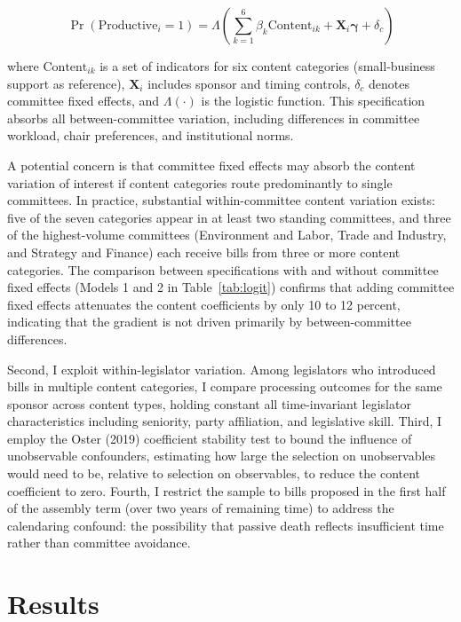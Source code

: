 \documentclass[11pt]{article}
\begin{document}
\begin{equation}
\Pr(\text{Productive}_i = 1) = \Lambda\left(\sum_{k=1}^{6} \beta_k \text{Content}_{ik} + \mathbf{X}_i \boldsymbol{\gamma} + \delta_c \right)
\label{eq:main}
\end{equation}

\noindent where $\text{Content}_{ik}$ is a set of indicators for six content categories (small-business support as reference), $\mathbf{X}_i$ includes sponsor and timing controls, $\delta_c$ denotes committee fixed effects, and $\Lambda(\cdot)$ is the logistic function. This specification absorbs all between-committee variation, including differences in committee workload, chair preferences, and institutional norms.

A potential concern is that committee fixed effects may absorb the content variation of interest if content categories route predominantly to single committees. In practice, substantial within-committee content variation exists: five of the seven categories appear in at least two standing committees, and three of the highest-volume committees (Environment and Labor, Trade and Industry, and Strategy and Finance) each receive bills from three or more content categories. The comparison between specifications with and without committee fixed effects (Models 1 and 2 in Table~\ref{tab:logit}) confirms that adding committee fixed effects attenuates the content coefficients by only 10 to 12 percent, indicating that the gradient is not driven primarily by between-committee differences.

Second, I exploit within-legislator variation. Among legislators who introduced bills in multiple content categories, I compare processing outcomes for the same sponsor across content types, holding constant all time-invariant legislator characteristics including seniority, party affiliation, and legislative skill. Third, I employ the Oster (2019) coefficient stability test to bound the influence of unobservable confounders, estimating how large the selection on unobservables would need to be, relative to selection on observables, to reduce the content coefficient to zero. Fourth, I restrict the sample to bills proposed in the first half of the assembly term (over two years of remaining time) to address the calendaring confound: the possibility that passive death reflects insufficient time rather than committee avoidance.


\section{Results}
\label{sec:results}
\end{document}
